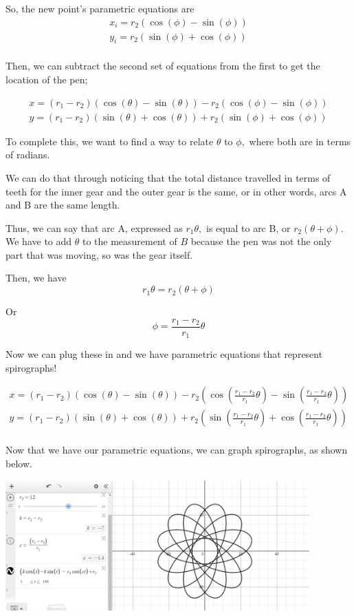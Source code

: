 \documentclass{article}
\begin{document}
So, the new point's parametric equations are 
\begin{align*}
    x_i = r_2 \left( \cos(\phi) - \sin(\phi) \right) \\
    y_i = r_2  \left( \sin(\phi) + \cos(\phi) \right) \\
\end{align*}

Then, we can subtract the second set of equations from the first to get the location of the pen; 

\begin{align*}
    x = (r_1 - r_2) \left(\cos(\theta) - \sin(\theta) \right) - r_2  \left( \cos(\phi) - \sin(\phi) \right) \\
    y = (r_1 - r_2)(\sin(\theta) + \cos(\theta)) + r_2 (\sin(\phi) + \cos(\phi))
\end{align*}

To complete this, we want to find a way to relate $\theta$ to $\phi,$ where both are in terms of radians.

We can do that through noticing that the total distance travelled in terms of teeth for the inner gear and the outer gear is the same, or in other words, arcs A and B are the same length.

Thus, we can say that arc A, expressed as $r_1 \theta,$ is equal to arc B, or $r_2 (\theta + \phi).$ We have to add $\theta$ to the measurement of $B$ because the pen was not the only part that was moving, so was the gear itself. 

Then, we have $$r_1 \theta = r_2 (\theta + \phi)$$

Or $$ \phi = \frac{r_1 - r_2}{r_1}  \theta$$

Now we can plug these in and we have parametric equations that represent spirographs!

\begin{align*}
    x = (r_1 - r_2) (\cos(\theta) - \sin(\theta)) - r_2  \left( \cos\left(\frac{r_1 - r_2}{r_1}  \theta \right) - \sin\left(\frac{r_1 - r_2}{r_1}  \theta \right) \right) \\
    y = (r_1 - r_2) \left(\sin(\theta) + \cos(\theta) \right) + r_2 \left(\sin\left(\frac{r_1 - r_2}{r_1}  \theta \right) + \cos\left(\frac{r_1 - r_2}{r_1}  \theta \right) \right) \\
\end{align*}

Now that we have our parametric equations, we can graph spirographs, as shown below.

\begin{center}
\includegraphics[height=5cm]{images/Spirograph.png}
\end{center}
\end{document}
